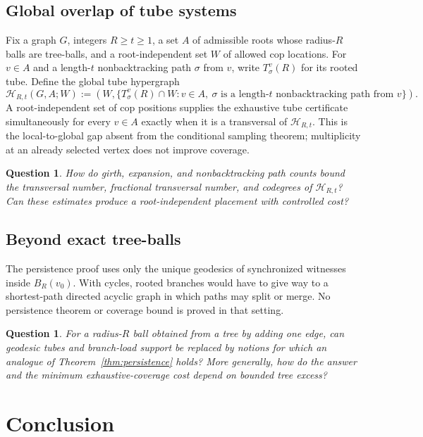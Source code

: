 \documentclass[11pt]{amsart}
\newtheorem{question}[theorem]{Question}
\theoremstyle{definition}
\begin{document}
\subsection{Global overlap of tube systems}

Fix a graph $G$, integers $R\geq t\geq1$, a set $A$ of admissible roots whose radius-$R$ balls are tree-balls, and a root-independent set $W$ of allowed cop locations. For $v\in A$ and a length-$t$ nonbacktracking path $\sigma$ from $v$, write $T_\sigma^v(R)$ for its rooted tube. Define the global tube hypergraph
\[
\mathcal H_{R,t}(G,A;W)
:=\left(W,\{T_\sigma^v(R)\cap W:v\in A,\ \sigma\text{ is a length-$t$ nonbacktracking path from }v\}\right).
\]
A root-independent set of cop positions supplies the exhaustive tube certificate simultaneously for every $v\in A$ exactly when it is a transversal of $\mathcal H_{R,t}$. This is the local-to-global gap absent from the conditional sampling theorem; multiplicity at an already selected vertex does not improve coverage.

\begin{question}
How do girth, expansion, and nonbacktracking path counts bound the transversal number, fractional transversal number, and codegrees of $\mathcal H_{R,t}$? Can these estimates produce a root-independent placement with controlled cost?
\end{question}

\subsection{Beyond exact tree-balls}

The persistence proof uses only the unique geodesics of synchronized witnesses inside $B_R(v_0)$. With cycles, rooted branches would have to give way to a shortest-path directed acyclic graph in which paths may split or merge. No persistence theorem or coverage bound is proved in that setting.

\begin{question}
For a radius-$R$ ball obtained from a tree by adding one edge, can geodesic tubes and branch-load support be replaced by notions for which an analogue of Theorem~\ref{thm:persistence} holds? More generally, how do the answer and the minimum exhaustive-coverage cost depend on bounded tree excess?
\end{question}

\section{Conclusion}
\end{document}
